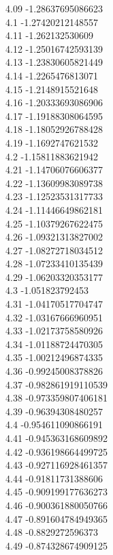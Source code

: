 {4.09	-1.28637695086623\\
4.1	-1.27420212148557\\
4.11	-1.262132530609\\
4.12	-1.25016742593139\\
4.13	-1.23830605821449\\
4.14	-1.2265476813071\\
4.15	-1.2148915521648\\
4.16	-1.20333693086906\\
4.17	-1.19188308064595\\
4.18	-1.18052926788428\\
4.19	-1.1692747621532\\
4.2	-1.15811883621942\\
4.21	-1.14706076606377\\
4.22	-1.13609983089738\\
4.23	-1.12523531317733\\
4.24	-1.11446649862181\\
4.25	-1.10379267622475\\
4.26	-1.09321313827002\\
4.27	-1.08272718034512\\
4.28	-1.07233410135439\\
4.29	-1.06203320353177\\
4.3	-1.051823792453\\
4.31	-1.04170517704747\\
4.32	-1.03167666960951\\
4.33	-1.02173758580926\\
4.34	-1.01188724470305\\
4.35	-1.00212496874335\\
4.36	-0.99245008378826\\
4.37	-0.982861919110539\\
4.38	-0.973359807406181\\
4.39	-0.96394308480257\\
4.4	-0.954611090866191\\
4.41	-0.945363168609892\\
4.42	-0.936198664499725\\
4.43	-0.927116928461357\\
4.44	-0.91811731388606\\
4.45	-0.909199177636273\\
4.46	-0.900361880050766\\
4.47	-0.891604784949365\\
4.48	-0.8829272596373\\
4.49	-0.874328674909125\\
}
